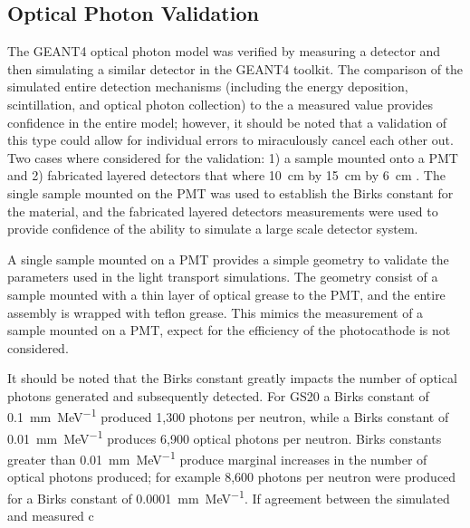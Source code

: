 \subsection{Optical Photon Validation}
\label{sec:OpticalPhotonValidation}
The GEANT4 optical photon model was verified by measuring a detector and then simulating a similar detector in the GEANT4 toolkit. 
The comparison of the simulated entire  detection mechanisms (including the energy deposition, scintillation, and optical photon collection) to the a measured value provides confidence in the entire model; however, it should be noted that a validation of this type could allow for individual errors to miraculously cancel each other out.
Two cases where considered for the validation: 1) a sample mounted onto a PMT and 2) fabricated layered detectors that where  \SI{10}{cm} by \SI{15}{cm} by \SI{6}{cm} .
The single sample mounted on the PMT was used to establish the Birks constant for the material, and the fabricated layered detectors measurements were used to provide confidence of the ability to simulate a large scale detector system.

A single sample mounted on a PMT provides a simple geometry to validate the parameters used in the light transport simulations. 
The geometry consist of a sample mounted with a thin layer of optical grease to the PMT, and the entire assembly is wrapped with teflon grease.
This mimics the measurement of a sample mounted on a PMT, expect for the efficiency of the photocathode is not considered.

It should be noted that the Birks constant greatly impacts the number of optical photons generated and subsequently detected.
For GS20 a Birks constant of \SI{0.1}{\mm\per\MeV} produced 1,300 photons per neutron, while a Birks constant of \SI{0.01}{\mm\per\MeV} produces 6,900 optical photons per neutron.
Birks constants greater than \SI{0.01}{\mm\per\MeV} produce marginal increases in the number of optical photons produced; for example 8,600 photons per neutron were produced for a Birks constant of \SI{0.0001}{\mm\per\MeV}.
If agreement between the simulated and measured c
